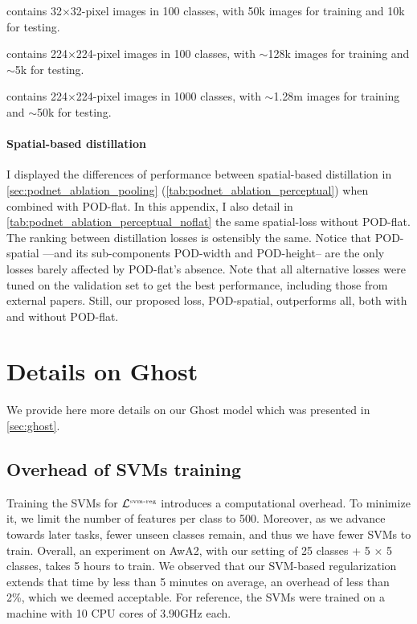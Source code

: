 {\begin{description} \setlength{\parskip}{0pt}
    \item[CIFAR100] contains 32$\times$32-pixel images in 100 classes, with 50k images for training
          and 10k for testing.
    \item[ImageNet100] contains 224$\times$224-pixel images in 100 classes, with $\sim$128k images
          for training and $\sim$5k for testing.
    \item[ImageNet1000] contains 224$\times$224-pixel images in 1000 classes, with $\sim$1.28m
          images for training and $\sim$50k for testing. \end{description}}

\paragraph{Spatial-based distillation} I displayed the differences of performance between
spatial-based distillation in \autoref{sec:podnet_ablation_pooling}
(\autoref{tab:podnet_ablation_perceptual}) when combined with POD-flat. In this appendix, I also
detail in \autoref{tab:podnet_ablation_perceptual_noflat} the same spatial-loss without POD-flat.
The ranking between distillation losses is ostensibly the same. Notice that POD-spatial ---and its
sub-components POD-width and POD-height-- are the only losses barely affected by POD-flat's absence.
Note that all alternative losses were tuned on the validation set to get the best performance,
including those from external papers. Still, our proposed loss, POD-spatial, outperforms all, both
with and without POD-flat.





\section{Details on Ghost}
\label{sec:appendix_ghost}

We provide here more details on our Ghost model which was presented in \autoref{sec:ghost}.


\subsection{Overhead of SVMs training}

Training the SVMs for $\mathcal{L}^{\text{\tiny{svm-reg}}}$ introduces a computational overhead. To
minimize it, we limit the number of features per class to 500. Moreover, as we advance towards later
tasks, fewer unseen classes remain, and thus we have fewer SVMs to train. Overall, an experiment on
AwA2, with our setting of 25 classes + 5 $\times$ 5 classes, takes 5 hours to train. We observed
that our SVM-based regularization extends that time by less than 5 minutes on average, an overhead
of less than 2\%, which we deemed acceptable. For reference, the SVMs were trained on a machine with
10 CPU cores of 3.90GHz each.

